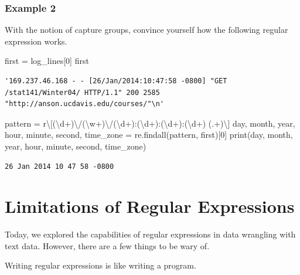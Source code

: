\documentclass[
  letterpaper,
  DIV=11,
  numbers=noendperiod]{scrreprt}
\newenvironment{Shaded}{\begin{snugshade}}{\end{snugshade}}
\newcommand{\BuiltInTok}[1]{\textcolor[rgb]{0.00,0.23,0.31}{#1}}
\newcommand{\DecValTok}[1]{\textcolor[rgb]{0.68,0.00,0.00}{#1}}
\newcommand{\NormalTok}[1]{\textcolor[rgb]{0.00,0.23,0.31}{#1}}
\newcommand{\OperatorTok}[1]{\textcolor[rgb]{0.37,0.37,0.37}{#1}}
\newcommand{\VerbatimStringTok}[1]{\textcolor[rgb]{0.13,0.47,0.30}{#1}}
\begin{document}
\hypertarget{example-2}{%
\subsubsection{Example 2}\label{example-2}}

With the notion of capture groups, convince yourself how the following
regular expression works.

\begin{Shaded}
\begin{Highlighting}[]
\NormalTok{first }\OperatorTok{=}\NormalTok{ log\_lines[}\DecValTok{0}\NormalTok{]}
\NormalTok{first}
\end{Highlighting}
\end{Shaded}

\begin{verbatim}
'169.237.46.168 - - [26/Jan/2014:10:47:58 -0800] "GET /stat141/Winter04/ HTTP/1.1" 200 2585 "http://anson.ucdavis.edu/courses/"\n'
\end{verbatim}

\begin{Shaded}
\begin{Highlighting}[]
\NormalTok{pattern }\OperatorTok{=} \VerbatimStringTok{r\textquotesingle{}\textbackslash{}[(\textbackslash{}d+)\textbackslash{}/(\textbackslash{}w+)\textbackslash{}/(\textbackslash{}d+):(\textbackslash{}d+):(\textbackslash{}d+):(\textbackslash{}d+) (.+)\textbackslash{}]\textquotesingle{}}
\NormalTok{day, month, year, hour, minute, second, time\_zone }\OperatorTok{=}\NormalTok{ re.findall(pattern, first)[}\DecValTok{0}\NormalTok{]}
\BuiltInTok{print}\NormalTok{(day, month, year, hour, minute, second, time\_zone)}
\end{Highlighting}
\end{Shaded}

\begin{verbatim}
26 Jan 2014 10 47 58 -0800
\end{verbatim}

\hypertarget{limitations-of-regular-expressions}{%
\section{Limitations of Regular
Expressions}\label{limitations-of-regular-expressions}}

Today, we explored the capabilities of regular expressions in data
wrangling with text data. However, there are a few things to be wary of.

Writing regular expressions is like writing a program.
\end{document}
